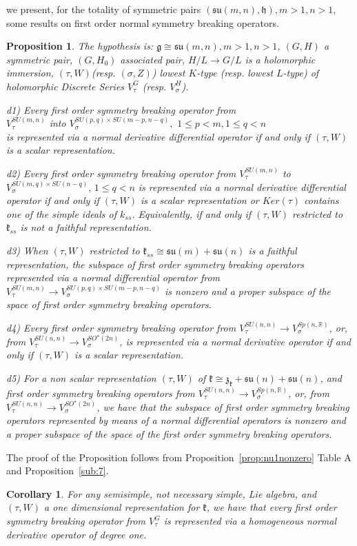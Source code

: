 \documentclass[12pt]{amsart}
\newtheorem{prop}[thm]{Proposition}
\newtheorem{cor}[thm]{Corollary}
\theoremstyle{definition}
\theoremstyle{remark}
\newcommand{\g}{\mathfrak{g}}
\newcommand{\h}{\mathfrak{h}}
\renewcommand{\k}{{\mathfrak k}}
\newcommand{\R}{{\mathbb R}}
\numberwithin{equation}{section}
\begin{document}
we  present, for the totality of  symmetric pairs $(\mathfrak{su}(m,n),\h), m>1,  n>1 $, some results  on first order normal symmetry breaking operators.
\begin{prop}\label{prop:first} The hypothesis is: $\g \cong \mathfrak{su}(m,n), m>1,n>1$, $(G,H)$ a symmetric pair, $(G,H_0)$ associated pair, $H/L \rightarrow G/L$ is a holomorphic immersion, $(\tau, W)$(resp. $(\sigma, Z)$) lowest $K$-type (resp. lowest $L$-type) of holomorphic Discrete Series $V_\tau^G$ (resp. $V_\sigma^H$).



d1)  Every first order symmetry breaking operator from \\ \phantom{xxxccccc}$V_\tau^{SU(m,n)} $ into $ V_\sigma^{SU(p,q)\times SU(m-p,n-q)},\,\,1\leq p <m, 1\leq q <n$ \\ is represented via a normal derivative differential operator if and only if  $(\tau,W)$ is a scalar representation.

d2)   Every first order symmetry breaking operator from $V_{\tau}^{SU(m,n)} $ to $ V_{\sigma}^{SU(m,q)\times SU(n-q)}, \, 1\leq q <n$ is represented via a normal derivative differential operator if and only if  $(\tau,W)$ is a scalar representation or $Ker(\tau)$ contains one of the simple ideals of $k_{ss}$. Equivalently, if and only if $(\tau, W)$ restricted to   $\k_{ss}$ is not a faithful representation.

d3) When $(\tau, W)$  restricted to  $\k_{ss}\cong  \mathfrak{su}(m)+\mathfrak{su}(n)$ is a faithful representation, the subspace of first order symmetry breaking operators represented  via a normal differential operator from $V_\tau^{SU(m,n)}\rightarrow V_\sigma^{SU(p,q)\times SU(m-p,n-q)}$ is nonzero and a proper subspace of the space of  first order symmetry breaking  operators.

d4) Every first order symmetry breaking operator from $ V_\tau^{SU(n,n)} \rightarrow V_\sigma^{Sp(n,\R)}$, or, from  $  V_\tau^{SU(n,n)}  \rightarrow V_\sigma^{SO^\star(2n)}$, is represented via a normal derivative operator if and only if $(\tau,W)$ is a scalar representation.

d5) For    a  non scalar representation    $(\tau, W)$  of $\k\cong \mathfrak z_\k +\mathfrak{su}(n)+\mathfrak{su}(n)$, and  first order symmetry breaking operators from $ V_\tau^{SU(n,n)} \rightarrow V_\sigma^{Sp(n,\R)}$, or, from $  V_\tau^{SU(n,n)}  \rightarrow V_\sigma^{SO^\star(2n)}$, we have that   the subspace of first order symmetry breaking operators  represented by means of a normal differential operators is nonzero and a proper subspace of the space of the first order symmetry breaking  operators.
\end{prop}
The proof of the Proposition follows from Proposition~\ref{prop:nu1nonzero} Table A and Proposition~\ref{sub:7}.
\begin{cor} For any semisimple, not necessary simple, Lie algebra,  and $(\tau, W)$ a one dimensional representation for $\k$, we have that every first order symmetry breaking operator from $V_\tau^G$ is represented via a homogeneous normal derivative operator of degree one.
\end{cor}
\end{document}

